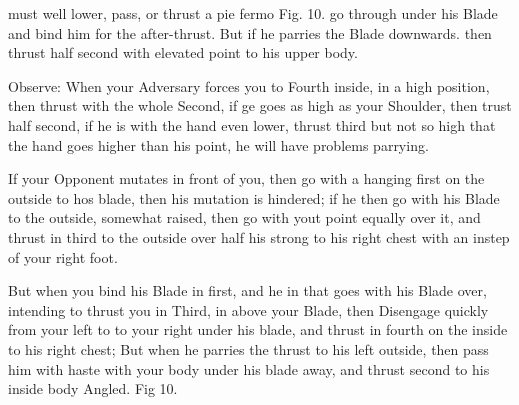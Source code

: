 \newpage


\newpage


must well lower, pass, or thrust a pie fermo Fig. 10. go through under his Blade and bind him for the after-thrust. But if he parries the Blade downwards. then thrust half second with elevated point to his upper body.

\exercise{}


Observe: When your Adversary forces you to Fourth inside, in a high
position, then thrust with the whole Second, if ge goes as high as
your Shoulder, then trust half second, if he is with the hand even
lower, thrust third but not so high that the hand goes higher than his
point, he will have problems parrying.

\exercise{}


If your Opponent mutates in front of you, then go with a hanging first
on the outside to hos blade, then his mutation is hindered; if he then
go with his Blade to the outside, somewhat raised, then go with yout
point equally over it, and thrust in third to the outside over half
his strong to his right chest with an instep of your right foot.


\exercise{}

But when you bind his Blade in first, and he in that goes with his
Blade over, intending to thrust you in Third, in above your Blade,
then Disengage quickly from your left to to your right under his
blade, and thrust in fourth on the inside to his right chest; But when
he parries the thrust to his left outside, then pass him with haste
with your body under his blade away, and thrust second to his inside
body Angled. Fig 10.

